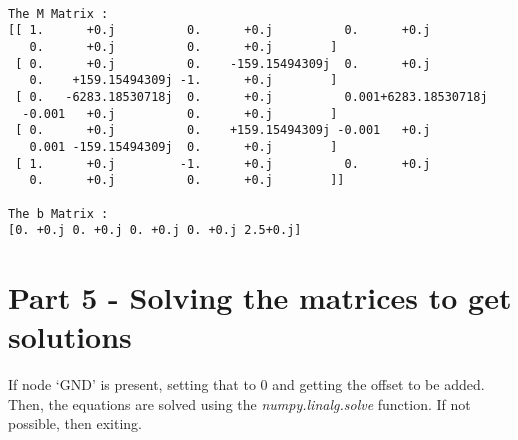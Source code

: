 \documentclass[11pt]{article}
\begin{document}
    \begin{Verbatim}[commandchars=\\\{\}]

The M Matrix :
[[ 1.      +0.j          0.      +0.j          0.      +0.j
   0.      +0.j          0.      +0.j        ]
 [ 0.      +0.j          0.    -159.15494309j  0.      +0.j
   0.    +159.15494309j -1.      +0.j        ]
 [ 0.   -6283.18530718j  0.      +0.j          0.001+6283.18530718j
  -0.001   +0.j          0.      +0.j        ]
 [ 0.      +0.j          0.    +159.15494309j -0.001   +0.j
   0.001 -159.15494309j  0.      +0.j        ]
 [ 1.      +0.j         -1.      +0.j          0.      +0.j
   0.      +0.j          0.      +0.j        ]]

The b Matrix :
[0. +0.j 0. +0.j 0. +0.j 0. +0.j 2.5+0.j]

    \end{Verbatim}

	
		
    \hypertarget{part-5---solving-the-matrices-to-get-solutions}{%
\section{Part 5 - Solving the matrices to get
solutions}\label{part-5---solving-the-matrices-to-get-solutions}}

If node `GND' is present, setting that to 0 and getting the offset to be
added. Then, the equations are solved using the
\emph{numpy.linalg.solve} function. If not possible, then exiting.

	

	
		
	
	
		
			
		
	
		
			
		
	
		
			
		
	
		
			
		
	
		
			
		
	
		
			
		
	
		
			
		
	
		
			
		
	
		
			
		
	
		
			
\end{document}
